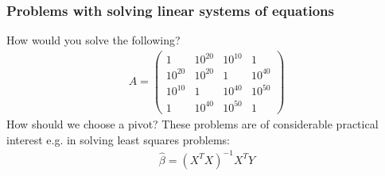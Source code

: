 \documentclass{beamer}
\begin{document}
\begin{frame}
\frametitle{Problems with solving linear systems of equations}
How would you solve the following?
\begin{align*}
A = \begin{pmatrix}
1&10^{20}&10^{10}&1\\
10^{20}&10^{20}&1&10^{40}\\
10^{10}&1&10^{40}&10^{50}\\
1&10^{40}&10^{50}&1
\end{pmatrix}
\end{align*}
How should we choose a pivot? These problems are of considerable practical interest e.g.
in solving least squares problems:
\begin{align*}
\hat{\beta} = (X^TX)^{-1}X^T Y
\end{align*}
\end{frame}
\end{document}

